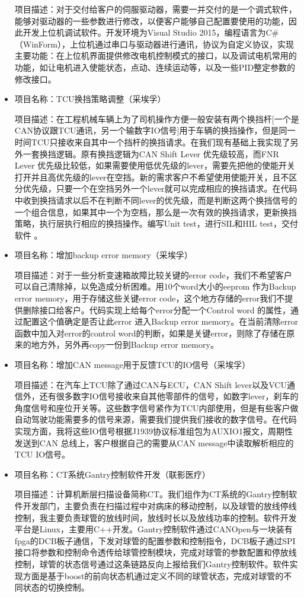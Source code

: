 \documentclass[
]{article}
\begin{document}
\begin{CJK}{UTF8}{gbsn}
\begin{itemize}
  项目描述：对于交付给客户的伺服驱动器，需要一并交付的是一个调式软件，能够对驱动器的一些参数进行修改，以便客户能够自己配置要使用的功能，因此开发上位机调试软件。开发环境为Visual
  Studio
  2015，编程语言为C\#（WinForm），上位机通过串口与驱动器进行通讯，协议为自定义协议，实现主要功能：在上位机界面提供修改电机控制模式的接口，以及调试电机常用的功能，如让电机进入使能状态，点动、连续运动等，以及一些PID整定参数的修改接口。
\item
  项目名称：TCU换挡策略调整（采埃孚）

  项目描述：在工程机械车辆上为了司机操作方便一般安装有两个换挡杆{[}一个是CAN协议跟TCU通讯，另一个输数字IO信号{]}用于车辆的换挡操作，但是同一时间TCU只接收来自其中一个挡杆的换挡请求。在我们现有基础上我实现了另外一套换挡逻辑。原有换挡逻辑为CAN
  Shift Lever 优先级较高，而FNR Lever
  优先级比较低，如果需要使用低优先级的lever，需要先把他的使能开关打开并且高优先级的lever在空挡。新的需求客户不希望使用使能开关，且不区分优先级，只要一个在空挡另外一个lever就可以完成相应的换挡请求。在代码中收到换挡请求以后不在判断不同lever的优先级，而是判断这两个换挡信号的一个组合信息，如果其中一个为空档，那么是一次有效的换挡请求，更新换挡策略，执行层执行相应的换挡操作。编写Unit
  test，进行SIL和HIL test，交付软件 。
\item
  项目名称：增加backup error memory（采埃孚）

  项目描述：对于一些分析变速箱故障比较关键的error
  code，我们不希望客户可以自己清除掉，以免造成分析困难。用10个word大小的eeprom
  作为Backup error memory，用于存储这些关键error
  code，这个地方存储的error我们不提供删除接口给客户。代码实现上给每个error分配一个Control
  word 的属性，通过配置这个值确定是否让此error 进入Backup error
  memory。在当前清除error函数中加入对error的control
  word的判断，如果是关键error，则除了存储在原来的地方外，另外再copy一份到Backup
  error memory。
\item
  项目名称：增加CAN message用于反馈TCU的IO信号（采埃孚）

  项目描述：在汽车上TCU除了通过CAN与ECU，CAN Shift
  lever以及VCU通信外，还有很多数字IO信号接收来自其他零部件的信号，如数字lever，刹车的角度信号和座位开关等。这些数字信号紧作为TCU内部使用，但是有些客户做自动驾驶功能需要多的信号来源，需要我们提供我们接收的数字信号。在代码实现方面，我将这些IO信号根据J1939协议标准组包为AUXIO1报文，周期性发送到CAN
  总线上，客户根据自己的需要从CAN message中读取解析相应的TCU IO信号。
\item
  项目名称：CT系统Gantry控制软件开发（联影医疗）

  项目描述：计算机断层扫描设备简称CT。我们组作为CT系统的Gantry控制软件开发部门，主要负责在扫描过程中对病床的移动控制，以及球管的放线停线控制，我主要负责球管的放线时间，放线时长以及放线功率的控制。软件开发平台是Linux，主要用C++开发。Gantry控制软件通过CANOpen与一块装有fpga的DCB板子通信，下发对球管的配置参数和控制指令，DCB板子通过SPI接口将参数和控制命令透传给球管控制模块，完成对球管的参数配置和停放线控制，球管的状态信号通过这条链路反向上报给我们Gantry控制软件。软件实现方面是基于boost的前向状态机通过定义不同的球管状态，完成对球管的不同状态的切换控制。
\end{itemize}


\end{CJK}
\end{document}
